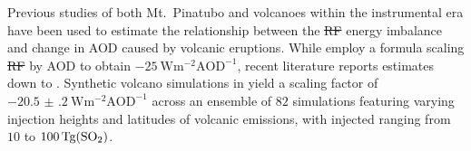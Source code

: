 \documentclass[draft]{agujournal2019}
\makeatletter
\providecommand{\DIFadd}[1]{{\protect\color{blue}\uwave{#1}}} %
\providecommand{\DIFdel}[1]{{\protect\color{red}\sout{#1}}} %
\providecommand{\DIFaddbegin}{} %
\providecommand{\DIFaddend}{} %
\providecommand{\DIFdelbegin}{} %
\providecommand{\DIFdelend}{} %
\let\sout@orig\sout %
\renewcommand{\sout}[1]{\ifmmode\text{\sout@orig{\ensuremath{#1}}}\else\sout@orig{#1}\fi} %
\makeatother
\begin{document}
  Previous studies of both Mt.\ Pinatubo \cite{mills2017,hansen2005} and volcanoes
  within the instrumental era \cite{gregory2016} have been used to estimate the
  relationship between the \DIFdelbegin \DIFdel{RF }\DIFdelend \DIFaddbegin \DIFadd{ERF }\DIFaddend energy imbalance and change in AOD caused by volcanic
  eruptions. While  employ a formula scaling \DIFdelbegin \DIFdel{RF }\DIFdelend \DIFaddbegin \DIFadd{ERF }\DIFaddend by AOD to obtain
  \(\SI{-25}{\watt\metre^{-2}\mathrm{AOD}^{-1}}\), recent literature reports estimates
  down to \DIFdelbegin %
\DIFdelend \DIFaddbegin {}
  \DIFaddend {}. Synthetic volcano
  simulations in  yield a scaling factor of
  \(\SI{-20.5(2)}{\watt\metre^{-2}\mathrm{AOD}^{-1}}\) across an ensemble of \(82\)
  simulations featuring varying injection heights and latitudes of volcanic emissions,
  with injected  ranging from \(10\) to \(\SI{100}{\tera\gram(\ce{SO2})}\).
\end{document}
